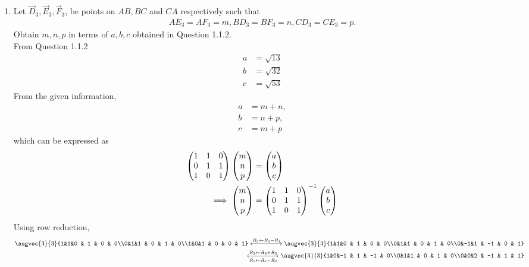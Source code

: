 \documentclass[11pt]{book}
\begin{document}
\begin{enumerate}[label=\thesection.\arabic*.,ref=\thesection.\theenumi]


\item Let $\vec{D}_3, \vec{E}_3, \vec{F}_3$, be points on $AB, BC$ and $CA$ respectively such that
\begin{align}
AE_3 = AF_3 = m, BD_3 = BF_3 = n, CD_3 = CE_3 = p.
\end{align}
Obtain $m,n,p$ in terms of $a,b,c$ obtained in Question 1.1.2. \\ 
\solution 
From Question 1.1.2
\begin{align}
    a &= \sqrt{13} \\ b &= \sqrt{32} \\ c &= \sqrt{53}
\end{align}
From the given information, 
\begin{align}
% 
    a &= m+n,\\
    b &= n+p, \\
    c &= m+p 
\end{align}
which can be expressed as
\begin{align}
\begin{pmatrix}1&1&0\\0&1&1\\1&0&1\\\end{pmatrix}\begin{pmatrix}m\\n\\p\end{pmatrix} &= \begin{pmatrix}a\\b\\c\end{pmatrix}
\\
\implies 
	\begin{pmatrix}m\\n\\p\end{pmatrix} &= \begin{pmatrix}1&1&0\\0&1&1\\1&0&1\\\end{pmatrix}^{-1}\begin{pmatrix}a\\b\\c\end{pmatrix}
\end{align}
Using row reduction,
\begin{align}
\augvec{3}{3}{1&1&0 & 1 & 0 & 0\\0&1&1 & 0 & 1 & 0\\1&0&1 & 0 & 0 & 1}
\xleftrightarrow[]{R_3 \leftarrow R_3 - R_1}
\augvec{3}{3}{1&1&0 & 1 & 0 & 0\\0&1&1 & 0 & 1 & 0\\0&-1&1 & -1 & 0 & 1} \\
\xleftrightarrow[R_1 \leftarrow R_1 - R_2]{R_3 \leftarrow R_3 + R_2}
\augvec{3}{3}{1&0&-1 & 1 & -1 & 0\\0&1&1 & 0 & 1 & 0\\0&0&2 & -1 & 1 & 1} \\

\end{align}
\end{enumerate}
\end{document}
